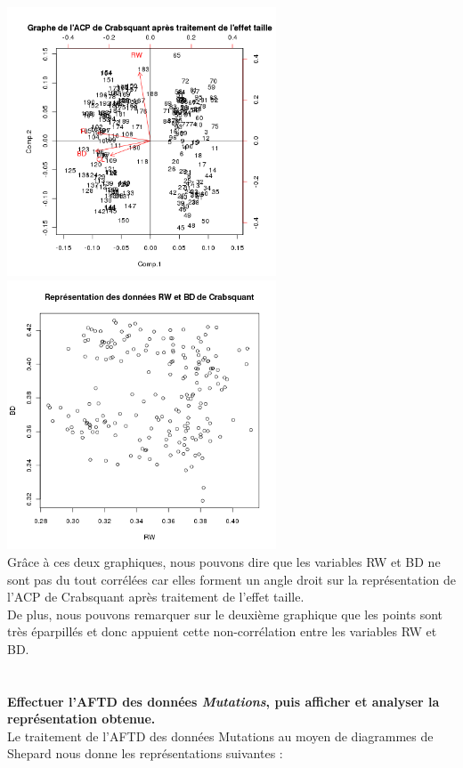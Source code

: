 \documentclass[a4paper, 10pt]{article}
\begin{document}
\includegraphics[height = 8cm, width = 8cm]{plots/biplot_axe_factoriel_3.png}
\includegraphics[height = 8cm, width = 8cm]{plots/plot_crabsquant_bd_rw.png}\\
Gr\^ace \`a ces deux graphiques, nous pouvons dire que les variables RW et BD ne sont pas du tout corr\'el\'ees
car elles forment un angle droit sur la repr\'esentation de l'ACP de Crabsquant apr\`es traitement de l'effet taille.\\
De plus, nous pouvons remarquer sur le deuxi\`eme graphique que les points sont tr\`es \'eparpill\'es et
donc appuient cette non-corr\'elation entre les variables RW et BD.\\ \\ \\
\textbf{Effectuer l'AFTD des donn\'ees \textit{Mutations}, puis afficher et analyser la repr\'esentation obtenue.}\\
Le traitement de l'AFTD des donn\'ees Mutations au moyen de diagrammes de Shepard nous donne les repr\'esentations suivantes :\\
\end{document}
